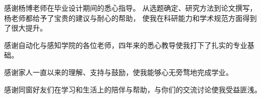 
\begin{acknowledgements}
  感谢杨博老师在毕业设计期间的悉心指导。
  从选题确定、研究方法到论文撰写，杨老师都给予了宝贵的建议与耐心的帮助，
  使我在科研能力和学术规范方面得到了很大提升。

  感谢自动化与感知学院的各位老师，四年来的悉心教导使我打下了扎实的专业基础。

  感谢家人一直以来的理解、支持与鼓励，使我能够心无旁骛地完成学业。

  感谢同窗好友们在学习和生活上的陪伴与帮助，与你们的交流讨论使我受益匪浅。
\end{acknowledgements}

